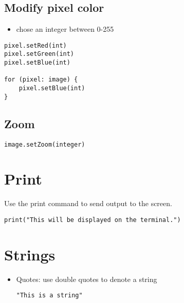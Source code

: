 \documentclass{article}
\begin{document}
\subsection{Modify pixel color}
\begin{itemize}
  \item chose an integer between 0-255
\end{itemize}
\begin{lstlisting}
pixel.setRed(int)
pixel.setGreen(int)
pixel.setBlue(int)

for (pixel: image) {
    pixel.setBlue(int)
}
\end{lstlisting}

\subsection{Zoom}
\begin{lstlisting}
image.setZoom(integer)
\end{lstlisting}

\section{Print}
Use the print command to send output to the screen.

\begin{lstlisting}
print("This will be displayed on the terminal.")
\end{lstlisting}

\section{Strings}

\begin{itemize}
  \item Quotes: use double quotes to denote a string
\begin{lstlisting}
"This is a string"
\end{lstlisting}

\end{itemize}

\newpage

%

\end{document}
